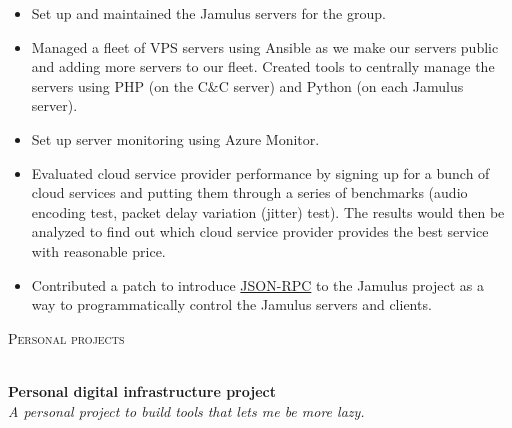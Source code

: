 \documentclass[a4paper]{article}
\newcommand{\lineunder} {
    \vspace*{-8pt} \\
    \hspace*{-18pt} \hrulefill \\
}
\newcommand{\header} [1] {
    {\hspace*{-18pt}\vspace*{6pt} \textsc{#1}}
    \vspace*{-6pt} \lineunder
}
\begin{document}
\begin{itemize} \itemsep 1pt
    
	\item Set up and maintained the Jamulus servers for the group.
    
	\item Managed a fleet of VPS servers using Ansible as we make our servers public and adding more servers to our fleet. Created tools to centrally manage the servers using PHP (on the C\&C server) and Python (on each Jamulus server).
    
	\item Set up server monitoring using Azure Monitor.
    
	\item Evaluated cloud service provider performance by signing up for a bunch of cloud services and putting them through a series of benchmarks (audio encoding test, packet delay variation (jitter) test). The results would then be analyzed to find out which cloud service provider provides the best service with reasonable price.
    
	\item Contributed a patch to introduce \href{https://github.com/jamulussoftware/jamulus/pull/1975}{JSON-RPC} to the Jamulus project as a way to programmatically control the Jamulus servers and clients.
    
\end{itemize}

\vspace{2mm}



\header{Personal projects}
\vspace{1mm}

\textbf{Personal digital infrastructure project}\\
\textit{A personal project to build tools that lets me be more lazy.}
\end{document}
